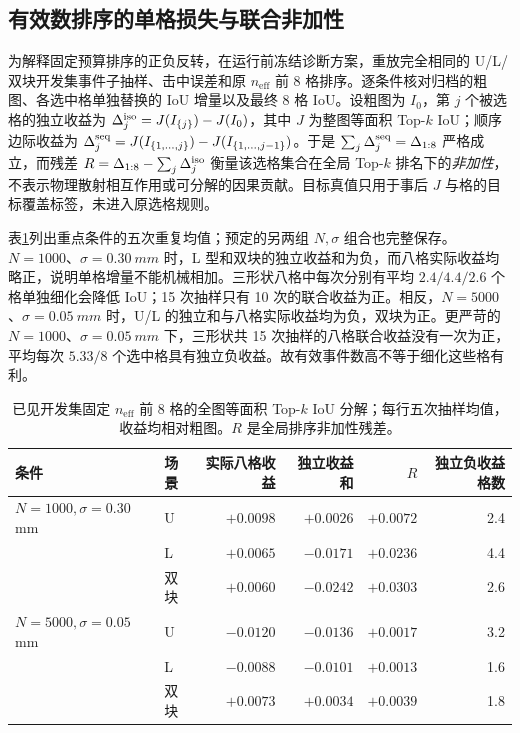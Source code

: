 \documentclass[UTF8,fontset=none,zihao=-4,a4paper]{ctexart}
\begin{document}
\subsection{有效数排序的单格损失与联合非加性}
为解释固定预算排序的正负反转，在运行前冻结诊断方案，重放完全相同的 U/L/双块开发集事件子抽样、击中误差和原 $n_{\mathrm{eff}}$ 前 8 格排序。逐条件核对归档的粗图、各选中格单独替换的 IoU 增量以及最终 8 格 IoU。设粗图为 $I_0$，第 $j$ 个被选格的独立收益为 $\Delta_j^{\rm iso}=J(I_{\{j\}})-J(I_0)$，其中 $J$ 为整图等面积 Top-$k$ IoU；顺序边际收益为 $\Delta_j^{\rm seq}=J(I_{\{1,\ldots,j\}})-J(I_{\{1,\ldots,j-1\}})$。于是 $\sum_j\Delta_j^{\rm seq}=\Delta_{1:8}$ 严格成立，而残差 $R=\Delta_{1:8}-\sum_j\Delta_j^{\rm iso}$ 衡量该选格集合在全局 Top-$k$ 排名下的\emph{非加性}，不表示物理散射相互作用或可分解的因果贡献。目标真值只用于事后 $J$ 与格的目标覆盖标签，未进入原选格规则。

表\ref{tab:neff8-interaction}列出重点条件的五次重复均值；预定的另两组 $N,\sigma$ 组合也完整保存。$N=1000$、$\sigma=\SI{0.30}{mm}$ 时，L 型和双块的独立收益和为负，而八格实际收益均略正，说明单格增量不能机械相加。三形状八格中每次分别有平均 $2.4/4.4/2.6$ 个格单独细化会降低 IoU；15 次抽样只有 10 次的联合收益为正。相反，$N=5000$、$\sigma=\SI{0.05}{mm}$ 时，U/L 的独立和与八格实际收益均为负，双块为正。更严苛的 $N=1000$、$\sigma=\SI{0.05}{mm}$ 下，三形状共 15 次抽样的八格联合收益没有一次为正，平均每次 $5.33/8$ 个选中格具有独立负收益。故有效事件数高不等于细化这些格有利。

\begin{table}[H]
\centering
\caption{已见开发集固定 $n_{\mathrm{eff}}$ 前 8 格的全图等面积 Top-$k$ IoU 分解；每行五次抽样均值，收益均相对粗图。$R$ 是全局排序非加性残差。}
\label{tab:neff8-interaction}
\small
\begin{tabular}{llrrrr}
\toprule
条件 & 场景 & 实际八格收益 & 独立收益和 & $R$ & 独立负收益格数\\
\midrule
$N=1000,\sigma=0.30$ mm & U & $+0.0098$ & $+0.0026$ & $+0.0072$ & 2.4\\
 & L & $+0.0065$ & $-0.0171$ & $+0.0236$ & 4.4\\
 & 双块 & $+0.0060$ & $-0.0242$ & $+0.0303$ & 2.6\\
$N=5000,\sigma=0.05$ mm & U & $-0.0120$ & $-0.0136$ & $+0.0017$ & 3.2\\
 & L & $-0.0088$ & $-0.0101$ & $+0.0013$ & 1.6\\
 & 双块 & $+0.0073$ & $+0.0034$ & $+0.0039$ & 1.8\\
\bottomrule
\end{tabular}
\end{table}
\end{document}
